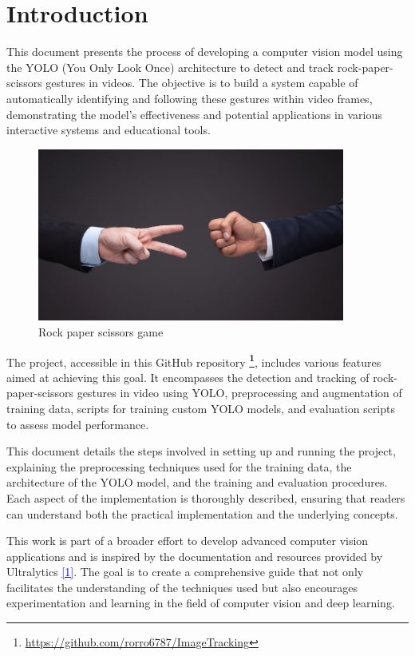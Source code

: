 \documentclass[../main]{subfiles}
\begin{document}
\chapter{Introduction}

{
\hypersetup{linkcolor=black}
\minitoc
}

This document presents the process of developing a computer vision model using the YOLO (You Only Look Once) architecture to detect and track rock-paper-scissors gestures in videos. The objective is to build a system capable of automatically identifying and following these gestures within video frames, demonstrating the model's effectiveness and potential applications in various interactive systems and educational tools.

\begin{figure}[H]
   \centering
   \includegraphics[width=0.9\textwidth]{./figures/skynews-rock-paper-scissors_4977001}
   \caption{Rock paper scissors game}
 \label{fig:red}
\end{figure}

The project, accessible in this GitHub repository \textbf{\footnote{\url{https://github.com/rorro6787/ImageTracking}}}, includes various features aimed at achieving this goal. It encompasses the detection and tracking of rock-paper-scissors gestures in video using YOLO, preprocessing and augmentation of training data, scripts for training custom YOLO models, and evaluation scripts to assess model performance.

This document details the steps involved in setting up and running the project, explaining the preprocessing techniques used for the training data, the architecture of the YOLO model, and the training and evaluation procedures. Each aspect of the implementation is thoroughly described, ensuring that readers can understand both the practical implementation and the underlying concepts.

This work is part of a broader effort to develop advanced computer vision applications and is inspired by the documentation and resources provided by Ultralytics \hyperlink{target:zona}{\textcolor{blue}{[1]}}. The goal is to create a comprehensive guide that not only facilitates the understanding of the techniques used but also encourages experimentation and learning in the field of computer vision and deep learning.
\end{document}
